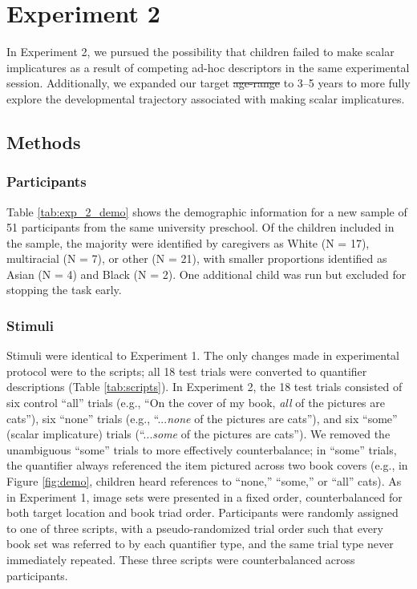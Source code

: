 \documentclass[man]{apa2}
\providecommand{\DIFadd}[1]{{\protect\color{blue}\uwave{#1}}} %
\providecommand{\DIFdel}[1]{{\protect\color{red}\sout{#1}}}                      %
\providecommand{\DIFaddbegin}{} %
\providecommand{\DIFaddend}{} %
\providecommand{\DIFdelbegin}{} %
\providecommand{\DIFdelend}{} %
\begin{document}
\section{Experiment 2}

In Experiment 2, we pursued the possibility that children failed to make scalar implicatures as a result of competing ad-hoc descriptors in the same experimental session. Additionally, we expanded our target \DIFdelbegin \DIFdel{age-range }\DIFdelend \DIFaddbegin \DIFadd{age range }\DIFaddend to 3--5 years to more fully explore the developmental trajectory associated with making scalar implicatures.

\subsection{Methods}
\subsubsection{Participants}

Table \ref{tab:exp_2_demo} shows the demographic information for a new sample of 51 participants from the same university preschool. Of the children included in the sample, the majority were identified by caregivers as White (N = 17), multiracial (N = 7), or other (N = 21), with smaller proportions identified as Asian (N = 4) and Black (N = 2). One additional child was run but excluded for stopping the task early.
\subsubsection{Stimuli}

Stimuli were identical to Experiment 1. The only changes made in experimental protocol were to the scripts;  all 18 test trials were converted to quantifier descriptions (Table \ref{tab:scripts}). In Experiment 2, the 18 test trials consisted of six control ``all'' trials (e.g., ``On the cover of my book, \textit{all} of the pictures are cats''), six ``none'' trials (e.g., ``...\textit{none} of the pictures are cats''), and six ``some'' (scalar implicature) trials (``...\textit{some} of the pictures are cats''). We removed the unambiguous ``some'' trials to more effectively counterbalance; in ``some'' trials, the quantifier always referenced the item pictured across two book covers (e.g., in Figure \ref{fig:demo}, children heard references to ``none,'' ``some,'' or ``all'' cats). As in Experiment 1, image sets were presented in a fixed order, counterbalanced for both target location and book triad order. Participants were randomly assigned to one of three scripts, with a pseudo-randomized trial order such that every book set was referred to by each quantifier type, and the same trial type never immediately repeated. These three scripts were counterbalanced across participants.
\end{document}
